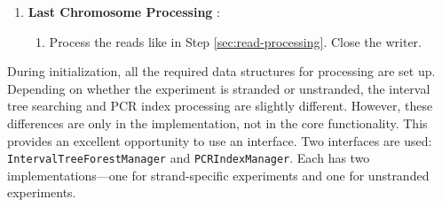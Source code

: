 \documentclass{article}
\begin{document}
\begin{enumerate}
\begin{enumerate}
\begin{enumerate}
                \item If the read pair is genic ($\texttt{cgenes}>0$), check if it is \texttt{transcriptomic}, \texttt{merged-transcriptomic}, or \texttt{intronic}.
                \item If the read pair is intergenic ($\texttt{cgenes}=0 \land \texttt{igenes}=0$), get the distance to the next gene and check if the read pair is antisense matching
                \item Send the read pair to the consumer thread and go to step \ref{sec:producer}.
            \end{enumerate}
            \item Reset the data structures and return to step \ref{sec:chromosome-check}.
        \end{enumerate}
        \item \textbf{Last Chromosome Processing} \label{sec:last-chromosome-processing}:
        \begin{enumerate}
            \item Process the reads like in Step \ref{sec:read-processing}. Close the writer.
        \end{enumerate}
    \end{enumerate}
    During initialization, all the required data structures for processing are set up. Depending on whether the experiment is stranded or unstranded, the interval tree searching and PCR index processing are slightly different. However, these differences are only in the implementation, not in the core functionality. This provides an excellent opportunity to use an interface. Two interfaces are used: \texttt{IntervalTreeForestManager} and \texttt{PCRIndexManager}. Each has two implementations—one for strand-specific experiments and one for unstranded experiments.
\end{document}
